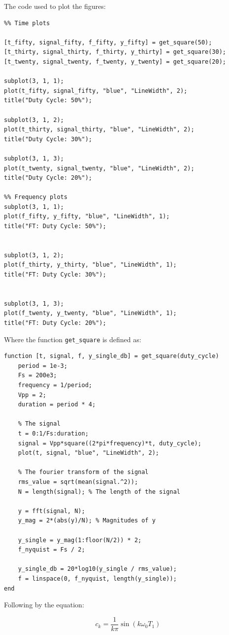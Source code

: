 The code used to plot the figures:
\newpage
\begin{verbatim}
%% Time plots

[t_fifty, signal_fifty, f_fifty, y_fifty] = get_square(50);
[t_thirty, signal_thirty, f_thirty, y_thirty] = get_square(30);
[t_twenty, signal_twenty, f_twenty, y_twenty] = get_square(20);

subplot(3, 1, 1);
plot(t_fifty, signal_fifty, "blue", "LineWidth", 2);
title("Duty Cycle: 50%");

subplot(3, 1, 2);
plot(t_thirty, signal_thirty, "blue", "LineWidth", 2);
title("Duty Cycle: 30%");

subplot(3, 1, 3);
plot(t_twenty, signal_twenty, "blue", "LineWidth", 2);
title("Duty Cycle: 20%");

%% Frequency plots
subplot(3, 1, 1);
plot(f_fifty, y_fifty, "blue", "LineWidth", 1);
title("FT: Duty Cycle: 50%");


subplot(3, 1, 2);
plot(f_thirty, y_thirty, "blue", "LineWidth", 1);
title("FT: Duty Cycle: 30%");


subplot(3, 1, 3);
plot(f_twenty, y_twenty, "blue", "LineWidth", 1);
title("FT: Duty Cycle: 20%");
\end{verbatim}
Where the function \texttt{get\_square} is defined as:
\newpage
\begin{verbatim}
function [t, signal, f, y_single_db] = get_square(duty_cycle)
    period = 1e-3;
    Fs = 200e3;
    frequency = 1/period;
    Vpp = 2;
    duration = period * 4;
    
    % The signal
    t = 0:1/Fs:duration;
    signal = Vpp*square((2*pi*frequency)*t, duty_cycle);
    plot(t, signal, "blue", "LineWidth", 2);
    
    % The fourier transform of the signal
    rms_value = sqrt(mean(signal.^2));
    N = length(signal); % The length of the signal
    
    y = fft(signal, N);
    y_mag = 2*(abs(y)/N); % Magnitudes of y
    
    y_single = y_mag(1:floor(N/2)) * 2;
    f_nyquist = Fs / 2;
    
    y_single_db = 20*log10(y_single / rms_value);
    f = linspace(0, f_nyquist, length(y_single));
end
\end{verbatim}

Following by the equation:

\begin{equation}
    c_k = \frac{1}{k\pi}\sin(k\omega_0T_1)
\end{equation}

